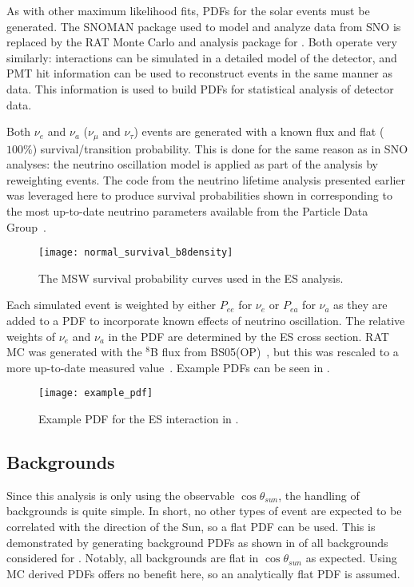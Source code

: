 As with other maximum likelihood fits, PDFs for the solar events must be generated.
The SNOMAN package used to model and analyze data from SNO is replaced by the RAT Monte Carlo and analysis package for {\snop}.
Both operate very similarly: interactions can be simulated in a detailed model of the detector, and PMT hit information can be used to reconstruct events in the same manner as data.
This information is used to build PDFs for statistical analysis of detector data.

Both $\nu_e$ and $\nu_a$ ($\nu_\mu$ and $\nu_\tau$) events are generated with a known flux and flat ($100\%$) survival/transition probability.
This is done for the same reason as in SNO analyses: the neutrino oscillation model is applied as part of the analysis by reweighting events.
The code from the neutrino lifetime analysis presented earlier was leveraged here to produce survival probabilities shown in  corresponding to the most up-to-date neutrino parameters available from the Particle Data Group~\cite{pdg}.

\begin{figure}
\centering
\texttt{[image: normal\_survival\_b8density]}
\caption{The MSW survival probability curves used in the {\snop} ES analysis.}
\label{fig:solar:msw}
\end{figure}

Each simulated event is weighted by either $P_{ee}$ for $\nu_e$ or $P_{ea}$ for $\nu_a$ as they are added to a PDF to incorporate known effects of neutrino oscillation.
The relative weights of $\nu_e$ and $\nu_a$ in the PDF are determined by the ES cross section.
RAT MC was generated with the $^8$B flux from BS05(OP)~\cite{bs05op}, but this was rescaled to a more up-to-date measured value~\cite{GlobalSolarFlux}.
Example PDFs can be seen in .

\begin{figure}
\centering
\texttt{[image: example\_pdf]}
\caption{Example PDF for the ES interaction in {\snop}.}
\label{fig:solar:pdfs}
\end{figure}

\subsection{Backgrounds}

Since this analysis is only using the observable $\cos{\theta_{sun}}$, the handling of backgrounds is quite simple.
In short, no other types of event are expected to be correlated with the direction of the Sun, so a flat PDF can be used.
This is demonstrated by generating background PDFs as shown in  of all backgrounds considered for {\snop}.
Notably, all backgrounds are flat in $\cos{\theta_{sun}}$ as expected.
Using MC derived PDFs offers no benefit here, so an analytically flat PDF is assumed.

